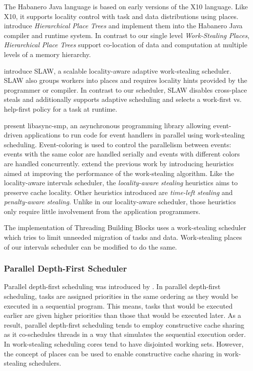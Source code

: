 The Habanero Java \cite{HJ} language is based on early versions of the
X10 language. Like X10, it supports locality control with task and
data distributions using places. \textcite{Yan2009} introduce
\emph{Hierarchical Place Trees} and implement them into the Habanero
Java compiler and runtime system. In contrast to our single level
\emph{Work-Stealing Places}, \emph{Hierarchical Place Trees} support
co-location of data and computation at multiple levels of a memory
hierarchy.

\textcite{Guo2010} introduce SLAW, a scalable locality-aware adaptive
work-stealing scheduler. SLAW also groups workers into places and
requires locality hints provided by the programmer or compiler. In
contrast to our scheduler, SLAW disables cross-place steals and
additionally supports adaptive scheduling and selects a work-first
vs. help-first policy for a task at runtime.

\textcite{Zeldovich2003} present libasync-smp, an asynchronous
programming library allowing event-driven applications to run code for
event handlers in parallel using work-stealing
scheduling. Event-coloring is used to control the parallelism between
events: events with the same color are handled serially and events
with different colors are handled concurrently. \textcite{Gaud2010}
extend the previous work by introducing heuristics aimed at improving
the performance of the work-stealing algorithm. Like the
locality-aware intervals scheduler, the \emph{locality-aware stealing}
heuristics aims to preserve cache locality. Other heuristics
introduced are \emph{time-left stealing} and \emph{penalty-aware
  stealing}. Unlike in our locality-aware scheduler, those heuristics
only require little involvement from the application programmers.

The implementation of Threading Building Blocks \cite{Contreras2008,
  Reinders2007} uses a work-stealing scheduler which tries to limit
unneeded migration of tasks and data. Work-stealing places of our
intervals scheduler can be modified to do the same.

\subsubsection{Parallel Depth-First Scheduler}

Parallel depth-first scheduling was introduced by
\textcite{Blelloch1999}. In parallel depth-first scheduling, tasks are
assigned priorities in the same ordering as they would be executed in
a sequential program. This means, tasks that would be executed earlier
are given higher priorities than those that would be executed
later. As a result, parallel depth-first scheduling tends to employ
constructive cache sharing \cite{Liaskovitis2006, Chen2007} as it
co-schedules threads in a way that simulates the sequential execution
order. In work-stealing scheduling cores tend to have disjointed
working sets. However, the concept of places can be used to enable
constructive cache sharing in work-stealing schedulers.


